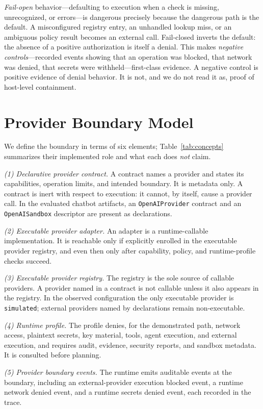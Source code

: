 \documentclass[conference]{IEEEtran}
\newcommand{\code}[1]{\texttt{\small #1}}
\begin{document}
\emph{Fail-open} behavior---defaulting to execution when a check is missing,
unrecognized, or errors---is dangerous precisely because the dangerous path is the default.
A misconfigured registry entry, an unhandled lookup miss, or an ambiguous policy result
becomes an external call. Fail-closed inverts the default: the absence of a positive
authorization is itself a denial. This makes \emph{negative controls}---recorded events
showing that an operation was blocked, that network was denied, that secrets were
withheld---first-class evidence. A negative control is positive evidence of denial
behavior. It is not, and we do not read it as, proof of host-level containment.

\section{Provider Boundary Model}\label{sec:model}
We define the boundary in terms of six elements; Table~\ref{tab:concepts} summarizes their
implemented role and what each does \emph{not} claim.

\emph{(1) Declarative provider contract.} A contract names a provider and states its
capabilities, operation limits, and intended boundary. It is metadata only. A contract is
inert with respect to execution: it cannot, by itself, cause a provider call. In the
evaluated chatbot artifacts, an \code{OpenAIProvider} contract and an \code{OpenAISandbox}
descriptor are present as declarations.

\emph{(2) Executable provider adapter.} An adapter is a runtime-callable implementation.
It is reachable only if explicitly enrolled in the executable provider registry, and even
then only after capability, policy, and runtime-profile checks succeed.

\emph{(3) Executable provider registry.} The registry is the sole source of callable
providers. A provider named in a contract is not callable unless it also appears in the
registry. In the observed configuration the only executable provider is \code{simulated};
external providers named by declarations remain non-executable.

\emph{(4) Runtime profile.} The profile denies, for the demonstrated path, network access,
plaintext secrets, key material, tools, agent execution, and external execution, and
requires audit, evidence, security reports, and sandbox metadata. It is consulted before
planning.

\emph{(5) Provider boundary events.} The runtime emits auditable events at the boundary,
including an external-provider execution blocked event, a runtime network denied event, and
a runtime secrets denied event, each recorded in the trace.
\end{document}
